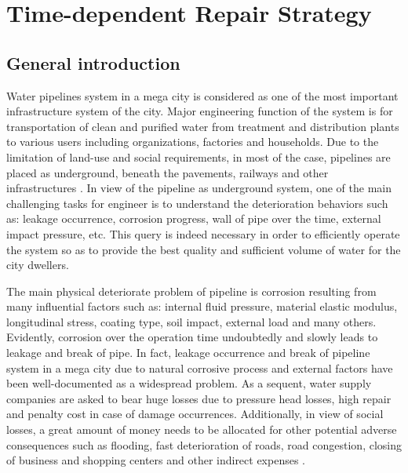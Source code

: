 
\chapter{Time-dependent Repair Strategy} %
\label{Chapter5}

\section{General introduction}
\label{51}
Water pipelines system in a mega city is considered as one of the most important infrastructure system of the city. Major engineering function of the system is for transportation of clean and purified water from treatment and distribution plants to various users including organizations, factories and households. Due to the limitation of land-use and social requirements, in most of the case, pipelines are placed as underground, beneath the pavements, railways and other infrastructures \cite{ahammed97}. In view of the pipeline as underground system, one of the main challenging tasks for engineer is to understand the deterioration behaviors such as: leakage occurrence, corrosion progress, wall of pipe over the time, external impact pressure, etc. This query is indeed necessary in order to efficiently operate the system so as to provide the best quality and sufficient volume of water for the city dwellers.

The main physical deteriorate problem of pipeline is corrosion resulting from many influential factors such as: internal fluid pressure, material elastic modulus, longitudinal stress, coating type, soil impact, external load and many others. Evidently, corrosion over the operation time undoubtedly and slowly leads to leakage and break of pipe. In fact, leakage occurrence and break of pipeline system in a mega city due to natural corrosive process and external factors have been well-documented as a widespread problem. As a sequent, water supply companies are asked to bear huge losses due to pressure head losses, high repair and penalty cost in case of damage occurrences. Additionally, in view of social losses, a great amount of money needs to be allocated for other potential adverse consequences such as flooding, fast deterioration of roads, road congestion, closing of business and shopping centers and other indirect expenses \cite{deb03}.

